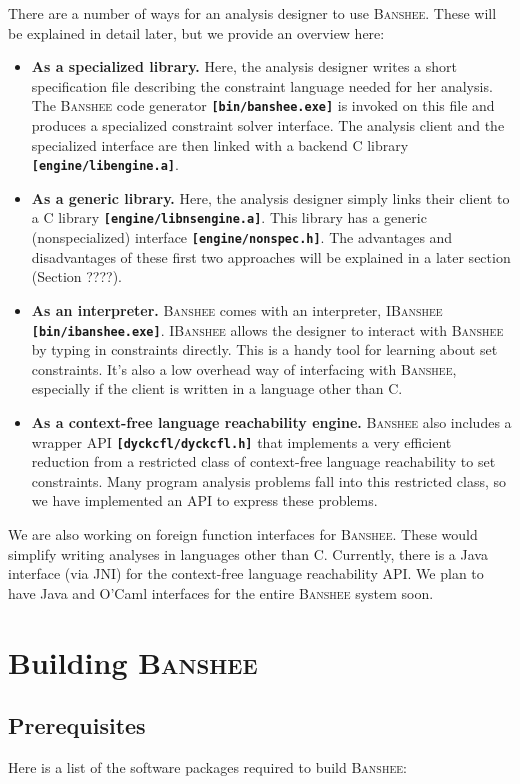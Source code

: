 \documentclass{article}
\newcommand{\banshee}{\textsc{Banshee}}
\newcommand{\ibanshee}{\textsc{IBanshee}}
\newcommand{\file}[1]{\texttt{\textbf{[#1]}}}
\begin{document}
There are a number of ways for an analysis designer to use
\banshee{}. These will be explained in detail later, but we provide an
overview here:
\begin{itemize}
\item \textbf{As a specialized library.} Here, the analysis designer
  writes a short specification file describing the constraint language
  needed for her analysis. The \banshee{} code generator
  \file{bin/banshee.exe} is invoked on this file and produces a
  specialized constraint solver interface. The analysis client and the
  specialized interface are then linked with a backend C library
  \file{engine/libengine.a}.
\item \textbf{As a generic library.} Here, the analysis designer
  simply links their client to a C library
  \file{engine/libnsengine.a}. This library has a generic
  (nonspecialized) interface \file{engine/nonspec.h}. The advantages
  and disadvantages of these first two approaches will be explained in
  a later section (Section ????).
\item \textbf{As an interpreter.} \banshee{} comes with an
  interpreter, \ibanshee{} \file{bin/ibanshee.exe}. \ibanshee{} allows
  the designer to interact with \banshee{} by typing in constraints
  directly. This is a handy tool for learning about set
  constraints. It's also a low overhead way of interfacing with
  \banshee{}, especially if the client is written in a language other
  than C.
\item \textbf{As a context-free language reachability engine.}
  \banshee{} also includes a wrapper API \file{dyckcfl/dyckcfl.h} that
  implements a very efficient reduction from a restricted class of
  context-free language reachability to set constraints. Many program
  analysis problems fall into this restricted class, so we have
  implemented an API to express these problems.
\end{itemize}

We are also working on foreign function interfaces for
\banshee{}. These would simplify writing analyses in languages other
than C. Currently, there is a Java interface (via JNI) for the
context-free language reachability API. We plan to have Java and
O'Caml interfaces for the entire \banshee{} system soon.

\section{Building \banshee{}}

\subsection{Prerequisites}
Here is a list of the software packages required to build \banshee{}:
\end{document}
